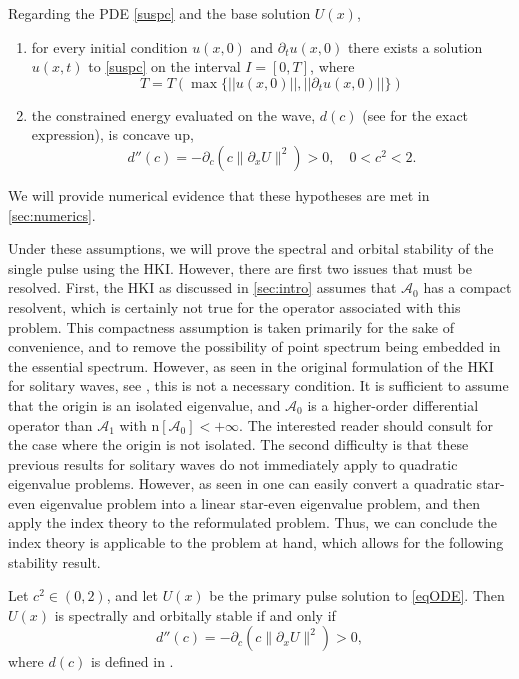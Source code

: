 \documentclass[review,onefignum,onetabnum]{siamart171218}
\newcommand{\rmn}{\mathrm{n}}
\newcommand{\calA}{\mathcal{A}}
\begin{document}
\begin{hypothesis}\label{PDEexisthyp}
Regarding the PDE \cref{suspc} and the base solution $U(x)$,
\begin{enumerate}
  \item for every initial condition $u(x,0)$ and $\partial_tu(x,0)$ there exists a solution $u(x, t)$ to \cref{suspc} on the interval $I = [0, T]$, where
      \[
      T=T\left(\max\{ ||u(x,0)||, ||\partial_tu(x,0)|| \}\right)
      \]
  \item the constrained energy evaluated on the wave, $d(c)$ (see \cite[Equation~(2.16)]{grillakis:sto87} for the exact expression), is concave up,
\begin{equation}\label{dcc}
d''(c) = -\partial_c\left( c\|\partial_xU\|^2 \right)>0,\quad0<c^2<2.
\end{equation}
\end{enumerate}
\end{hypothesis}
We will provide numerical evidence that these hypotheses are met in \cref{sec:numerics}.

Under these assumptions, we will prove the spectral and orbital stability of the single pulse using the HKI. However, there are first two issues that must be resolved. First, the HKI as discussed in \cref{sec:intro} assumes that $\calA_0$ has a compact resolvent, which is certainly not true for the operator associated with this problem. This compactness assumption is taken primarily for the sake of convenience, and to remove the possibility of point spectrum being embedded in the essential spectrum. However, as seen in the original formulation of the HKI for solitary waves, see \cite{kapitula:cev04,kapitula:ace05}, this is not a necessary condition. It is sufficient to assume that the origin is an isolated eigenvalue, and $\calA_0$ is a higher-order differential operator than $\calA_1$ with $\rmn[\calA_0]<+\infty$.  The interested reader should consult \cite{kapitula:ahk14} for the case where the origin is not isolated.
The second difficulty is that these previous results for solitary waves do not immediately apply to quadratic eigenvalue problems.  However, as seen in \cite[Section~4.1]{bronski:aii14} one can easily convert a quadratic star-even eigenvalue problem into a linear star-even eigenvalue problem, and then apply the index theory to the reformulated problem. Thus, we can conclude the index theory is applicable to the problem at hand, which allows for the following stability result.

\begin{lemma}\label{qstable}
Let $c^2 \in (0, 2)$, and let $U(x)$ be the primary pulse solution to \cref{eqODE}. Then $U(x)$ is spectrally and orbitally stable if and only if
\[
d''(c) = -\partial_c\left( c\|\partial_xU\|^2 \right)>0,
\]
where $d(c)$ is defined in \cite[equation (2.16)]{grillakis:sto87}.
\end{lemma}
\end{document}
